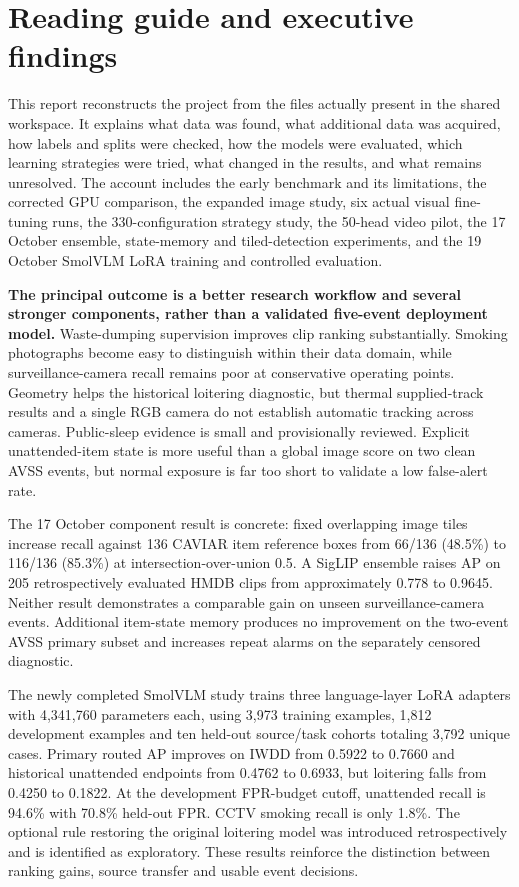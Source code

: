 \chapter*{Reading guide and executive findings}

This report reconstructs the project from the files actually present in the shared workspace. It explains what data was found, what additional data was acquired, how labels and splits were checked, how the models were evaluated, which learning strategies were tried, what changed in the results, and what remains unresolved. The account includes the early benchmark and its limitations, the corrected GPU comparison, the expanded image study, six actual visual fine-tuning runs, the 330-configuration strategy study, the 50-head video pilot, the 17 October ensemble, state-memory and tiled-detection experiments, and the 19 October SmolVLM LoRA training and controlled evaluation.

\textbf{The principal outcome is a better research workflow and several stronger components, rather than a validated five-event deployment model.} Waste-dumping supervision improves clip ranking substantially. Smoking photographs become easy to distinguish within their data domain, while surveillance-camera recall remains poor at conservative operating points. Geometry helps the historical loitering diagnostic, but thermal supplied-track results and a single RGB camera do not establish automatic tracking across cameras. Public-sleep evidence is small and provisionally reviewed. Explicit unattended-item state is more useful than a global image score on two clean AVSS events, but normal exposure is far too short to validate a low false-alert rate.

The 17 October component result is concrete: fixed overlapping image tiles increase recall against 136 CAVIAR item reference boxes from 66/136 (48.5\%) to 116/136 (85.3\%) at intersection-over-union 0.5. A SigLIP ensemble raises AP on 205 retrospectively evaluated HMDB clips from approximately 0.778 to 0.9645. Neither result demonstrates a comparable gain on unseen surveillance-camera events. Additional item-state memory produces no improvement on the two-event AVSS primary subset and increases repeat alarms on the separately censored diagnostic.

The newly completed SmolVLM study trains three language-layer LoRA adapters with 4,341,760 parameters each, using 3,973 training examples, 1,812 development examples and ten held-out source/task cohorts totaling 3,792 unique cases. Primary routed AP improves on IWDD from 0.5922 to 0.7660 and historical unattended endpoints from 0.4762 to 0.6933, but loitering falls from 0.4250 to 0.1822. At the development FPR-budget cutoff, unattended recall is 94.6\% with 70.8\% held-out FPR. CCTV smoking recall is only 1.8\%. The optional rule restoring the original loitering model was introduced retrospectively and is identified as exploratory. These results reinforce the distinction between ranking gains, source transfer and usable event decisions.

